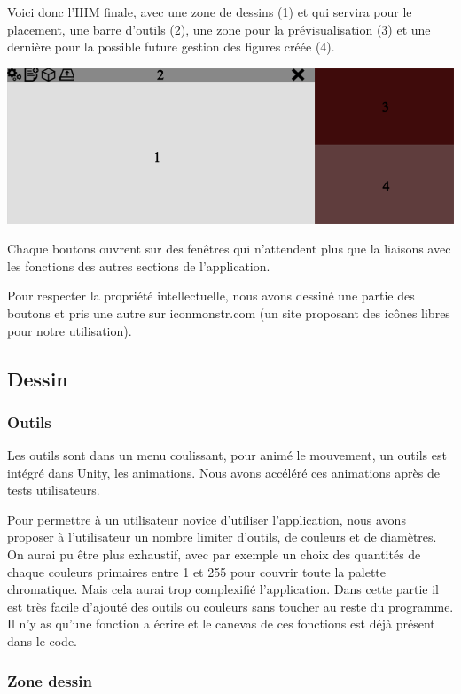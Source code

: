 \documentclass[a4paper,11pt]{article}
\begin{document}
			Voici donc l'IHM finale, avec une zone de dessins (1) et qui servira pour le placement, une barre d'outils (2), une zone pour la prévisualisation (3) et une dernière pour la possible future gestion des figures créée (4).
			
			\centerline{\includegraphics[scale=0.5]{images/ihm.png}}

			Chaque boutons ouvrent sur des fenêtres qui n'attendent plus que la liaisons avec les fonctions des autres sections de l'application.
			
			Pour respecter la propriété intellectuelle, nous avons dessiné une partie des boutons et pris une autre sur iconmonstr.com (un site proposant des icônes libres pour notre utilisation).
		\subsection{Dessin}
		
			\subsubsection{Outils}	
						
				Les outils sont dans un menu coulissant, pour animé le mouvement, un outils est intégré dans Unity, les animations. Nous avons accéléré ces animations après de tests utilisateurs.
					
				Pour permettre à un utilisateur novice d'utiliser l'application, nous avons proposer à l'utilisateur un nombre limiter d'outils, de couleurs et de diamètres. On aurai pu être plus exhaustif, avec par exemple un choix des quantités de chaque couleurs primaires entre 1 et 255 pour couvrir toute la palette chromatique. Mais cela aurai trop complexifié l'application.
				Dans cette partie il est très facile d'ajouté des outils ou couleurs sans toucher au reste du programme. Il n'y as qu'une fonction a écrire et le canevas de ces fonctions est déjà présent dans le code.
			\subsubsection{Zone dessin}
			
\end{document}
